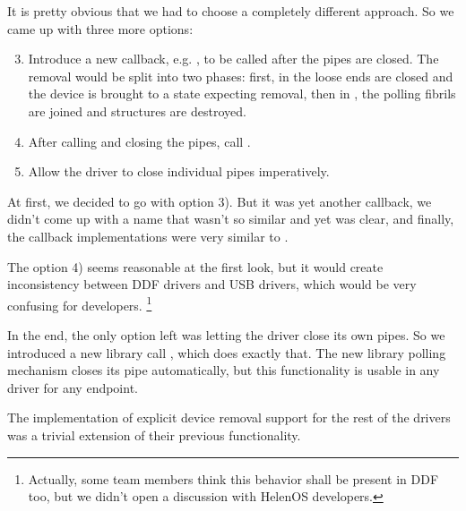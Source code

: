 \noindent It is pretty obvious that we had to choose a completely different approach. So
we came up with three more options:

\begin{enumerate}
\setcounter{enumi}{2}
	\item Introduce a new callback, e.g. , to be called
		after the pipes are closed. The removal would be split into two phases:
		first, in  the loose ends are closed and the
		device is brought to a state expecting removal, then in
		, the polling fibrils are joined and structures
		are destroyed.

	\item After calling  and closing the pipes, call
		.

	\item Allow the driver to close individual pipes imperatively.
\end{enumerate}

At first, we decided to go with option 3). But it was yet another callback, we
didn't come up with a name that wasn't so similar and yet was clear, and
finally, the  callback implementations were very similar
to .

The option 4) seems reasonable at the first look, but it would create
inconsistency between DDF drivers and USB drivers, which would be very
confusing for developers. \footnote{Actually, some team members think this
behavior shall be present in DDF too, but we didn't open a discussion with
HelenOS developers.}

In the end, the only option left was letting the driver close its own pipes. So
we introduced a new library call , which does
exactly that. The new library polling mechanism closes its pipe automatically,
but this functionality is usable in any driver for any endpoint.

The implementation of explicit device removal support for the rest of the
drivers was a trivial extension of their previous functionality.

